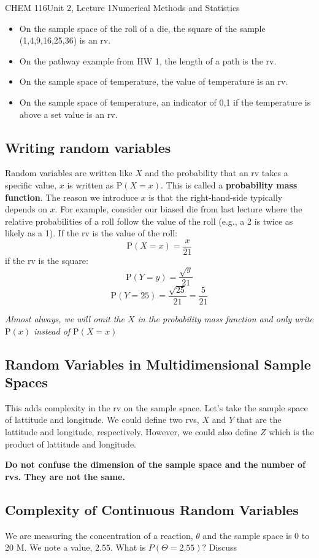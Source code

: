 \documentclass{article}
\renewcommand{\Pr}{\textrm{P}}
\begin{document}
\begin{tdoc}{CHEM 116}{Unit 2, Lecture 1}{Numerical Methods and Statistics}
\begin{itemize}
\item On the sample space of the roll of a die, the square of the
  sample (1,4,9,16,25,36) is an rv.

\item On the pathway example from HW 1, the
  length of a path is the rv.

\item On the sample space of temperature, the value of
  temperature is an rv.

\item On the sample space of temperature, an indicator of 0,1 if the
  temperature is above a set value is an rv.

\end{itemize}

\subsection{Writing random variables}

Random variables are written like $X$ and the probability that an rv
takes a specific value, $x$ is written as $\Pr(X=x)$. This is called a
{\bf probability mass function}. The reason we introduce $x$ is that
the right-hand-side typically depends on $x$. For example, consider
our biased die from last lecture where the relative probabilities of a
roll follow the value of the roll (e.g., a 2 is twice as likely as a
1). If the rv is the value of the roll:
\[
\Pr(X=x) = \frac{x}{21}
\]
if the rv is the square:
\[
\Pr(Y=y) = \frac{\sqrt{y}}{21}
\]
\[
\Pr(Y=25) = \frac{\sqrt{25}}{21} = \frac{5}{21}
\]

\emph{Almost always, we will omit the $X$ in the probability mass
  function and only write $\Pr(x)$ instead of $\Pr(X=x)$}

\subsection{Random Variables in Multidimensional Sample Spaces}
This adds complexity in the rv on the sample space. Let's take the
sample space of lattitude and longitude. We could define two rvs, $X$
and $Y$ that are the lattitude and longitude, respectively. However,
we could also define $Z$ which is the product of lattitude and
longitude.

{\bf Do not confuse the dimension of the sample space and the number of rvs. They are not the same.}

\subsection{Complexity of Continuous Random Variables}
We are measuring the concentration of a reaction, $\theta$ and the
sample space is 0 to 20 M. We note a value, $2.55$. What is
$P(\Theta=2.55)?$ Discuss


\end{tdoc}
\end{document}
